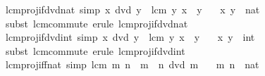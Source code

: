 \begin{isabellebody}
\endisatagproof
{\isafoldproof}%
%
\isadelimproof
\isanewline
%
\endisadelimproof
\isanewline
{}\isamarkupfalse%
\ lcm{\isacharunderscore}{\kern0pt}proj{}{\isacharunderscore}{\kern0pt}if{\isacharunderscore}{\kern0pt}dvd{\isacharunderscore}{\kern0pt}nat\ {\isacharbrackleft}{\kern0pt}simp{\isacharbrackright}{\kern0pt}{\isacharcolon}{\kern0pt}\ {\isachardoublequoteopen}x\ dvd\ y\ {\isasymLongrightarrow}\ lcm\ y\ x\ {\isacharequal}{\kern0pt}\ y{\isachardoublequoteclose}\isanewline
\ \ \ x\ y\ {\isacharcolon}{\kern0pt}{\isacharcolon}{\kern0pt}\ nat\isanewline
%
\isadelimproof
\ \ %
\endisadelimproof
%
\isatagproof
{}\isamarkupfalse%
\ {\isacharparenleft}{\kern0pt}subst\ lcm{\isachardot}{\kern0pt}commute{\isacharparenright}{\kern0pt}\ {\isacharparenleft}{\kern0pt}erule\ lcm{\isacharunderscore}{\kern0pt}proj{}{\isacharunderscore}{\kern0pt}if{\isacharunderscore}{\kern0pt}dvd{\isacharunderscore}{\kern0pt}nat{\isacharparenright}{\kern0pt}%
\endisatagproof
{\isafoldproof}%
%
\isadelimproof
\isanewline
%
\endisadelimproof
\isanewline
{}\isamarkupfalse%
\ lcm{\isacharunderscore}{\kern0pt}proj{}{\isacharunderscore}{\kern0pt}if{\isacharunderscore}{\kern0pt}dvd{\isacharunderscore}{\kern0pt}int\ {\isacharbrackleft}{\kern0pt}simp{\isacharbrackright}{\kern0pt}{\isacharcolon}{\kern0pt}\ {\isachardoublequoteopen}x\ dvd\ y\ {\isasymLongrightarrow}\ lcm\ y\ x\ {\isacharequal}{\kern0pt}\ {\isasymbar}y{\isasymbar}{\isachardoublequoteclose}\isanewline
\ \ \ x\ y\ {\isacharcolon}{\kern0pt}{\isacharcolon}{\kern0pt}\ int\isanewline
%
\isadelimproof
\ \ %
\endisadelimproof
%
\isatagproof
{}\isamarkupfalse%
\ {\isacharparenleft}{\kern0pt}subst\ lcm{\isachardot}{\kern0pt}commute{\isacharparenright}{\kern0pt}\ {\isacharparenleft}{\kern0pt}erule\ lcm{\isacharunderscore}{\kern0pt}proj{}{\isacharunderscore}{\kern0pt}if{\isacharunderscore}{\kern0pt}dvd{\isacharunderscore}{\kern0pt}int{\isacharparenright}{\kern0pt}%
\endisatagproof
{\isafoldproof}%
%
\isadelimproof
\isanewline
%
\endisadelimproof
\isanewline
{}\isamarkupfalse%
\ lcm{\isacharunderscore}{\kern0pt}proj{}{\isacharunderscore}{\kern0pt}iff{\isacharunderscore}{\kern0pt}nat\ {\isacharbrackleft}{\kern0pt}simp{\isacharbrackright}{\kern0pt}{\isacharcolon}{\kern0pt}\ {\isachardoublequoteopen}lcm\ m\ n\ {\isacharequal}{\kern0pt}\ m\ {\isasymlongleftrightarrow}\ n\ dvd\ m{\isachardoublequoteclose}\isanewline
\ \ \ m\ n\ {\isacharcolon}{\kern0pt}{\isacharcolon}{\kern0pt}\ nat\isanewline

\end{isabellebody}
